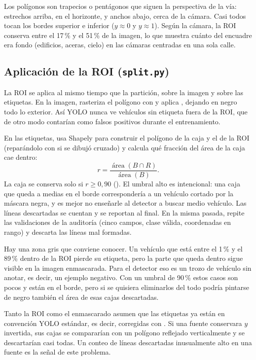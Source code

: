 \documentclass[11pt,a4paper]{article}
\begin{document}
Los polígonos son trapecios o pentágonos que siguen la perspectiva de la vía: estrechos arriba, en el horizonte, y anchos abajo, cerca de la cámara. Casi todos tocan los bordes superior e inferior ($y \approx 0$ y $y \approx 1$). Según la cámara, la ROI conserva entre el 17\,\% y el 51\,\% de la imagen, lo que muestra cuánto del encuadre era fondo (edificios, aceras, cielo) en las cámaras centradas en una sola calle.

\subsection{Aplicación de la ROI (\texorpdfstring{\texttt{split.py}}{split.py})}

La ROI se aplica al mismo tiempo que la partición, sobre la imagen y sobre las etiquetas. En la imagen,  rasteriza el polígono con  y aplica , dejando en negro todo lo exterior. Así YOLO nunca ve vehículos sin etiqueta fuera de la ROI, que de otro modo contarían como falsos positivos durante el entrenamiento.

En las etiquetas,  usa Shapely para construir el polígono de la caja y el de la ROI (reparándolo con  si se dibujó cruzado) y calcula qué fracción del área de la caja cae dentro:
\[
r = \frac{\operatorname{área}(B \cap R)}{\operatorname{área}(B)} .
\]
La caja se conserva solo si $r \ge 0{,}90$ (). El umbral alto es intencional: una caja que queda a medias en el borde correspondería a un vehículo cortado por la máscara negra, y es mejor no enseñarle al detector a buscar medio vehículo. Las líneas descartadas se cuentan y se reportan al final. En la misma pasada,  repite las validaciones de la auditoría (cinco campos, clase válida, coordenadas en rango) y descarta las líneas mal formadas.

Hay una zona gris que conviene conocer. Un vehículo que está entre el 1\,\% y el 89\,\% dentro de la ROI pierde su etiqueta, pero la parte que queda dentro sigue visible en la imagen enmascarada. Para el detector eso es un trozo de vehículo sin anotar, es decir, un ejemplo negativo. Con un umbral de 90\,\% estos casos son pocos y están en el borde, pero si se quisiera eliminarlos del todo podría pintarse de negro también el área de esas cajas descartadas.

Tanto la ROI como el enmascarado asumen que las etiquetas ya están en convención YOLO estándar, es decir, corregidas con . Si una fuente conservara $y$ invertida, sus cajas se compararían con un polígono reflejado verticalmente y se descartarían casi todas. Un conteo de líneas descartadas inusualmente alto en una fuente es la señal de este problema.
\end{document}
